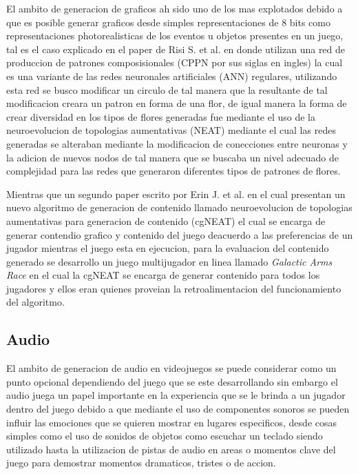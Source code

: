 El ambito de generacion de graficos ah sido uno de los mas explotados debido a
que es posible generar graficos desde simples representaciones de 8 bits como
representaciones photorealisticas de los eventos u objetos presentes en un
juego, tal es el caso explicado en el paper de Risi S. et al.\cite{Risi2012} en
donde utilizan una red de produccion de patrones composisionales (CPPN por sus
siglas en ingles) la cual es una variante de las redes neuronales artificiales
(ANN) regulares, utilizando esta red se busco modificar un circulo de tal manera
que la resultante de tal modificacion creara un patron en forma de una flor, de
igual manera la forma de crear diversidad en los tipos de flores generadas fue
mediante el uso de la neuroevolucion de topologias aumentativas (NEAT) mediante
el cual las redes generadas se alteraban mediante la modificacion de conecciones
entre neuronas y la adicion de nuevos nodos de tal manera que se buscaba un
nivel adecuado de complejidad para las redes que generaron diferentes tipos de
patrones de flores.

Mientras que un segundo paper escrito por Erin J. et al.\cite{Hastings2009} en
el cual presentan un nuevo algoritmo de generacion de contenido llamado
neuroevolucion de topologias aumentativas para generacion de contenido (cgNEAT)
el cual se encarga de generar contendio grafico y contenido del juego deacuerdo
a las preferencias de un jugador mientras el juego esta en ejecucion, para la
evaluacion del contenido generado se desarrollo un juego multijugador en linea
llamado \textit{Galactic Arms Race} en el cual la cgNEAT se encarga de generar
contenido para todos los jugadores y ellos eran quienes proveian la
retroalimentacion del funcionamiento del algoritmo.

\subsection{Audio}
\label{subsection:Audio}

El ambito de generacion de audio en videojuegos se puede considerar como un
punto opcional dependiendo del juego que se este desarrollando sin embargo el
audio juega un papel importante en la experiencia que se le brinda a un jugador
dentro del juego debido a que mediante el uso de componentes sonoros se pueden
influir las emociones que se quieren mostrar en lugares especificos, desde cosas
simples como el uso de sonidos de objetos como escuchar un teclado siendo
utilizado hasta la utilizacion de pistas de audio en areas o momentos clave del
juego para demostrar momentos dramaticos, tristes o de accion. 

